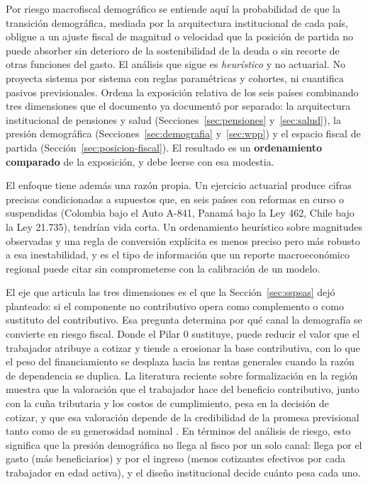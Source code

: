 \documentclass[12pt, letterpaper]{article}
\begin{document}
Por riesgo macrofiscal demográfico se entiende aquí la probabilidad de que la
transición demográfica, mediada por la arquitectura institucional de cada país,
obligue a un ajuste fiscal de magnitud o velocidad que la posición de partida no
puede absorber sin deterioro de la sostenibilidad de la deuda o sin recorte de otras
funciones del gasto. El análisis que sigue es \emph{heurístico} y no actuarial. No
proyecta sistema por sistema con reglas paramétricas y cohortes, ni cuantifica
pasivos previsionales. Ordena la exposición relativa de los seis países combinando
tres dimensiones que el documento ya documentó por separado: la arquitectura
institucional de pensiones y salud (Secciones~\ref{sec:pensiones}
y~\ref{sec:salud}), la presión demográfica (Secciones~\ref{sec:demografia}
y~\ref{sec:wpp}) y el espacio fiscal de partida
(Sección~\ref{sec:posicion-fiscal}). El resultado es un \textbf{ordenamiento
comparado} de la exposición, y debe leerse con esa modestia.

El enfoque tiene además una razón propia. Un ejercicio actuarial produce cifras
precisas condicionadas a supuestos que, en seis países con reformas en curso o
suspendidas (Colombia bajo el Auto A-841, Panamá bajo la Ley 462, Chile bajo la Ley
21.735), tendrían vida corta. Un ordenamiento heurístico
sobre magnitudes observadas y una regla de conversión explícita es menos preciso
pero más robusto a esa inestabilidad, y es el tipo de información que un reporte
macroeconómico regional puede citar sin comprometerse con la calibración de un
modelo.

El eje que articula las tres dimensiones es el que la Sección~\ref{sec:sspsas}
dejó planteado: si el componente no contributivo opera como complemento o como
sustituto del contributivo. Esa pregunta determina por qué canal la demografía se
convierte en riesgo fiscal. Donde el Pilar 0 sustituye, puede reducir el valor que
el trabajador atribuye a cotizar y tiende a erosionar la base contributiva, con lo
que el peso del financiamiento se desplaza hacia las rentas generales cuando la
razón de dependencia se duplica. La literatura reciente sobre formalización en la región
muestra que la valoración que el trabajador hace del beneficio contributivo, junto
con la cuña tributaria y los costos de cumplimiento, pesa en la decisión de
cotizar, y que esa valoración depende de la credibilidad de la promesa
previsional tanto como de su generosidad nominal \citep{wb2025}. En términos del
análisis de riesgo, esto significa que la presión demográfica no llega al fisco por
un solo canal: llega por el gasto (más beneficiarios) y por el ingreso (menos
cotizantes efectivos por cada trabajador en edad activa), y el diseño institucional
decide cuánto pesa cada uno.
\end{document}
